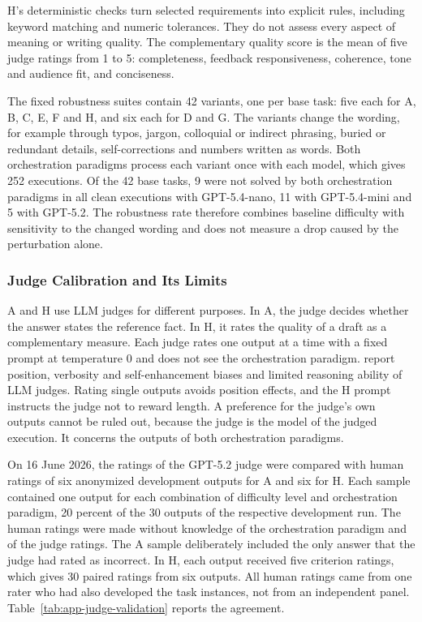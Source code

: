 H's deterministic checks turn selected requirements into explicit rules, including keyword matching and numeric tolerances. They do not assess every aspect of meaning or writing quality. The complementary quality score is the mean of five judge ratings from 1 to 5: completeness, feedback responsiveness, coherence, tone and audience fit, and conciseness.

The fixed robustness suites contain 42 variants, one per base task: five each for A, B, C, E, F and H, and six each for D and G. The variants change the wording, for example through typos, jargon, colloquial or indirect phrasing, buried or redundant details, self-corrections and numbers written as words. Both orchestration paradigms process each variant once with each model, which gives 252 executions. Of the 42 base tasks, 9 were not solved by both orchestration paradigms in all clean executions with GPT-5.4-nano, 11 with GPT-5.4-mini and 5 with GPT-5.2. The robustness rate therefore combines baseline difficulty with sensitivity to the changed wording and does not measure a drop caused by the perturbation alone.

\subsubsection{Judge Calibration and Its Limits}
\label{app:protocol/judges}

A and H use LLM judges for different purposes. In A, the judge decides whether the answer states the reference fact. In H, it rates the quality of a draft as a complementary measure. Each judge rates one output at a time with a fixed prompt at temperature 0 and does not see the orchestration paradigm. \textcite{zhengJudgingLLMasaJudgeMTBench2023} report position, verbosity and self-enhancement biases and limited reasoning ability of LLM judges. Rating single outputs avoids position effects, and the H prompt instructs the judge not to reward length. A preference for the judge's own outputs cannot be ruled out, because the judge is the model of the judged execution. It concerns the outputs of both orchestration paradigms.

On 16 June 2026, the ratings of the GPT-5.2 judge were compared with human ratings of six anonymized development outputs for A and six for H. Each sample contained one output for each combination of difficulty level and orchestration paradigm, 20 percent of the 30 outputs of the respective development run. The human ratings were made without knowledge of the orchestration paradigm and of the judge ratings. The A sample deliberately included the only answer that the judge had rated as incorrect. In H, each output received five criterion ratings, which gives 30 paired ratings from six outputs. All human ratings came from one rater who had also developed the task instances, not from an independent panel. Table~\ref{tab:app-judge-validation} reports the agreement.

